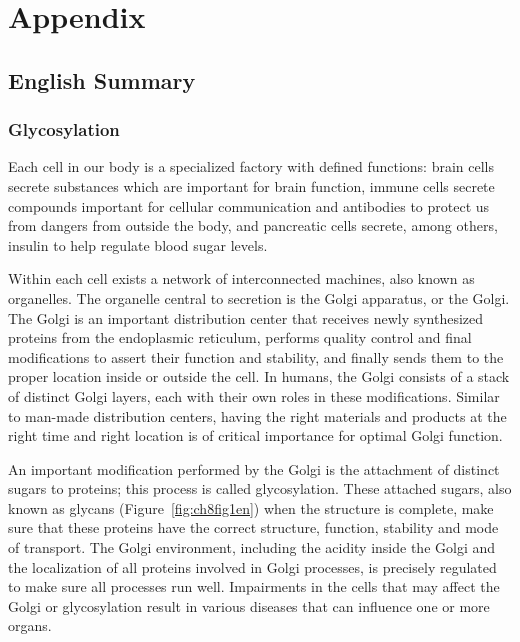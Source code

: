 
\stopthumb



\thispagestyle{empty}
\chapter{Appendix}
\thispagestyle{empty}

\clearpage

\continuethumb

\section{English Summary}

\subsection{Glycosylation}

Each cell in our body is a specialized factory with defined functions: brain cells secrete substances which are important for brain function, immune cells secrete compounds important for cellular communication and antibodies to protect us from dangers from outside the body, and pancreatic cells secrete, among others, insulin to help regulate blood sugar levels.

Within each cell exists a network of interconnected machines, also known as organelles. The organelle central to secretion is the Golgi apparatus, or the Golgi. The Golgi is an important distribution center that receives newly synthesized proteins from the endoplasmic reticulum, performs quality control and final modifications to assert their function and stability, and finally sends them to the proper location inside or outside the cell. In humans, the Golgi consists of a stack of distinct Golgi layers, each with their own roles in these modifications. Similar to man-made distribution centers, having the right materials and products at the right time and right location is of critical importance for optimal Golgi function.

An important modification performed by the Golgi is the attachment of distinct sugars to proteins; this process is called glycosylation\cite{moremen_vertebrate_2012}. These attached sugars, also known as glycans (Figure~\ref{fig:ch8fig1en}) when the structure is complete, make sure that these proteins have the correct structure, function, stability and mode of transport. The Golgi environment, including the acidity inside the Golgi and the localization of all proteins involved in Golgi processes, is precisely regulated to make sure all processes run well. Impairments in the cells that may affect the Golgi or glycosylation result in various diseases that can influence one or more organs.

